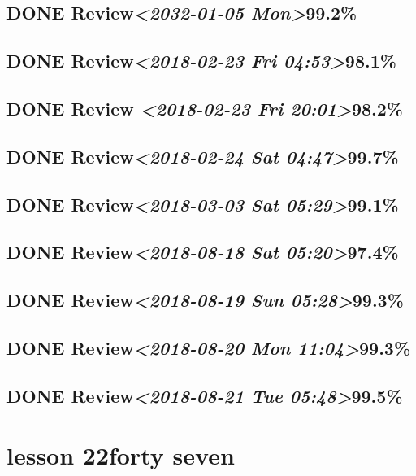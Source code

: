 \documentclass[11pt]{ctexart}
\begin{document}
\subsection{{\bfseries\sffamily DONE} Review\textit{<2032-01-05 Mon>}99.2\%}
\label{sec:orgb8e83a9}
\subsection{{\bfseries\sffamily DONE} Review\textit{<2018-02-23 Fri 04:53>}98.1\%}
\label{sec:orgeed746e}
\subsection{{\bfseries\sffamily DONE} Review \textit{<2018-02-23 Fri 20:01>}98.2\%}
\label{sec:orgc43f63c}
\subsection{{\bfseries\sffamily DONE} Review\textit{<2018-02-24 Sat 04:47>}99.7\%}
\label{sec:org8d3e469}
\subsection{{\bfseries\sffamily DONE} Review\textit{<2018-03-03 Sat 05:29>}99.1\%}
\label{sec:orgbfc74ce}
\subsection{{\bfseries\sffamily DONE} Review\textit{<2018-08-18 Sat 05:20>}97.4\%}
\label{sec:orge7e8610}
\subsection{{\bfseries\sffamily DONE} Review\textit{<2018-08-19 Sun 05:28>}99.3\%}
\label{sec:orgfbfa19d}
\subsection{{\bfseries\sffamily DONE} Review\textit{<2018-08-20 Mon 11:04>}99.3\%}
\label{sec:org632002e}
\subsection{{\bfseries\sffamily DONE} Review\textit{<2018-08-21 Tue 05:48>}99.5\%}
\label{sec:orgf029745}
\section{lesson 22forty seven}
\label{sec:orgcc0f717}
\end{document}
